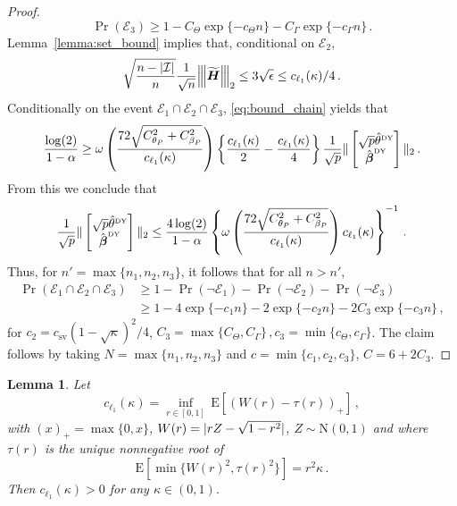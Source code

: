 \documentclass{article}
\makeatletter
\newtheorem{lemma}{Lemma}
\theoremstyle{definition}
\newcommand{\vnorm}[1]{%
	\ensuremath{%
		\if@display
		\left\| #1 \right\|
		\else
		\| #1 \|
		\fi
	}%
}
\newcommand{\abs}[1]{%
	\ensuremath{%
		\if@display
		\left| #1 \right|
		\else
		\lvert #1 \rvert
		\fi
	}%
}
\newcommand{\mnorm}[1]{{\left\vert\kern-0.25ex\left\vert\kern-0.25ex\left\vert #1
		\right\vert\kern-0.25ex\right\vert\kern-0.25ex\right\vert}}
\newcommand*{\bb}{\boldsymbol}
\newcommand{\betady}{\ensuremath{\hat{\bbeta}^{\textrm{\tiny DY}}}}
\newcommand{\thetady}{\ensuremath{\hat{\theta}^{\textrm{\tiny DY}}}}
\def\bH {\bb{H}}
\def\bbeta{\bb{\beta}}
\def\bH{\bb{H}}
\makeatother
\begin{document}
\begin{bibunit}
\begin{proof}
	$$
		\Pr\left(\mathcal{E}_3\right) \geq 1 - C_\Theta \exp \{ -c_\Theta n\} - C_\Gamma \exp \{-c_\Gamma n \} \,.
	$$
	Lemma~\ref{lemma:set_bound} implies that, conditional on $\mathcal{E}_2$,
	$$
	\sqrt{\frac{n - \abs{\mathcal{I}}}{n}} \frac{1}{\sqrt{n}} \mnorm{\widetilde{\bH}}_2 \leq 3\sqrt{\epsilon} \leq c_{\ell_1}(\kappa) / 4 \,.
	$$
	Conditionally on the event $\mathcal{E}_1 \cap \mathcal{E}_2 \cap \mathcal{E}_3$, \eqref{eq:bound_chain} yields that
	$$
	\frac{\log(2)}{1 - \alpha} \geq \omega\left(\frac{72 \sqrt{C_{\theta_P}^2 + C_{\beta_P}^2}}{c_{\ell_1}(\kappa)} \right) \left\{ \frac{c_{\ell_1}(\kappa)}{2} - \frac{c_{\ell_1}(\kappa)}{4} \right\} \frac{1}{\sqrt{p}} \vnorm{\begin{bmatrix} \sqrt{p} \thetady \\ \betady \end{bmatrix}}_2 \,.
	$$
	From this we conclude that
	$$
	\frac{1}{\sqrt{p}} \vnorm{\begin{bmatrix} \sqrt{p} \thetady \\ \betady \end{bmatrix}}_2 \leq \frac{4 \log(2)}{1 - \alpha} \left\{\omega\left(\frac{72 \sqrt{C_{\theta_P}^2 +  C_{\beta_P}^2}}{c_{\ell_1}(\kappa)} \right)c_{\ell_1}(\kappa) \right\}^{-1} \,.
	$$
	Thus, for $n' = \max\{n_1, n_2, n_3 \}$, it follows that for all $n > n'$,
	$$
	\begin{aligned}
		\Pr \left(\mathcal{E}_1 \cap \mathcal{E}_2 \cap \mathcal{E}_3 \right) &\geq 1 - \Pr(\lnot \mathcal{E}_1) - \Pr(\lnot \mathcal{E}_2) - \Pr(\lnot \mathcal{E}_3) \\ &\geq 1 - 4 \exp\{-c_1n\} - 2 \exp\{-c_2 n\} - 2C_3 \exp \{-c_3 n \} \,,
	\end{aligned}
	$$
	for $c_2=c_{\mathrm{sv}}(1-\sqrt\kappa)^2/4$, $C_3 = \max\{ C_\Theta, C_\Gamma\}\,, c_3 = \min\{c_\Theta, c_\Gamma \}$.
	The claim follows by taking $N = \max\{n_1, n_2, n_3 \}$ and $c = \min \{c_1, c_2, c_3\}$, $C = 6 + 2 C_3$.
\end{proof}


\begin{lemma} \label{lemma:ell_1_lb}
	Let
	\begin{equation}
	\label{eq:c_ell1_kappa}
		c_{\ell_1}(\kappa) = \underset{r \in [0,1]}{\inf} \, \mathrm{E}[(W(r) - \tau(r))_{+}] \,,
	\end{equation}
	with $(x)_{+} = \max\{0,x\}$, $W(r) = \abs{r Z - \sqrt{1 - r^2}}$, $Z \sim \mathrm{N}(0,1)$ and where $\tau(r)$ is the unique nonnegative root of
	$$
		\mathrm{E}[\min\{W(r)^2, \tau(r)^2 \}] = r^2 \kappa \,.
	$$
	Then  $c_{\ell_1}(\kappa) > 0$ for any $\kappa \in (0,1)$.


\end{lemma}
\end{bibunit}
\end{document}
